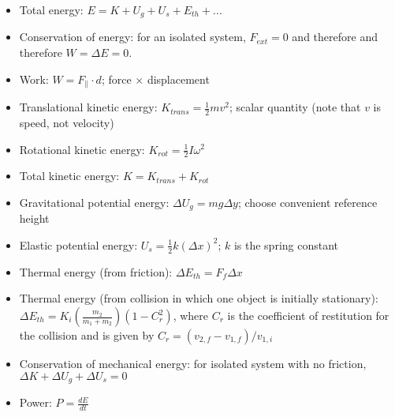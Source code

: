 \documentclass[11pt,letterpaper]{article}
\begin{document}
 \begin{itemize}
 \item Total energy: $E=K+U_g+U_s+E_{th}+...$
 \item Conservation of energy: for an isolated system, $F_{ext}=0$ and therefore and therefore $W=\Delta{E}=0$.
 \item Work: $W=F_\parallel\cdot{d}$; force $\times$ displacement
 \item Translational kinetic energy: $K_{trans}=\displaystyle\frac{1}{2}mv^2$; scalar quantity (note that $v$ is speed, not velocity)
 \item Rotational kinetic energy: $K_{rot}=\displaystyle\frac{1}{2}I\omega^2$
 \item Total kinetic energy: $K=K_{trans}+K_{rot}$
 \item Gravitational potential energy: $\Delta{U_g}=mg\Delta{y}$; choose convenient reference height
 \item Elastic potential energy: $U_s=\displaystyle\frac{1}{2}k(\Delta{x})^2$; $k$ is the spring constant
 \item Thermal energy (from friction): $\Delta{E_{th}}=F_f\Delta{x}$
 \item Thermal energy (from collision in which one object is initially stationary):\\
 $\Delta E_{th} = K_i\left(\frac{m_2}{m_1+m_2}\right)\left(1-C_r^2\right)$, where $C_r$ is the coefficient of restitution for the collision and is given by $C_r = (v_{2,f}-v_{1,f})/v_{1,i}$
 \item Conservation of mechanical energy: for isolated system with no friction, $\Delta{K}+\Delta{U_g}+\Delta{U_s}=0$
 \item Power: $P=\displaystyle\frac{d{E}}{d{t}}$
 \end{itemize}
\end{document}
